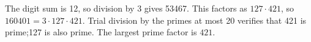 The digit sum is 12, so division by 3 gives 53467. This factors as $127\cdot421$, so $160401=3\cdot127\cdot421$. Trial division by the primes at most 20 verifies that 421 is prime;127 is also prime. The largest prime factor is $\boxed{421}$.
